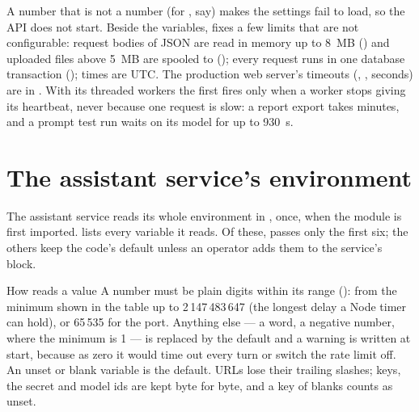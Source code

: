 A number that is not a number (for , say) makes the settings fail to
load, so the API does not start. Beside the variables,  fixes a few limits
that are not configurable: request bodies of JSON are read in memory up to 8~MB
() and uploaded files above 5~MB are spooled to
 (); every request runs in one database
transaction (); times are UTC. The production web server's timeouts
(, ,  seconds) are in
. With its threaded workers the first fires only when a worker
stops giving its heartbeat, never because one request is slow: a report export takes minutes,
and a prompt test run waits on its model for up to 930~s.


\section{The assistant service's environment}\label{sec:config:assistant}

The assistant service reads its whole environment in , once, when the module
is first imported.  lists every variable it reads. Of these,
 passes only the first six; the others keep the code's default
unless an operator adds them to the service's  block.

\begin{codebox}{How  reads a value}
A number must be plain digits within its range (): from the minimum shown
in the table up to 2\,147\,483\,647 (the longest delay a Node timer can hold), or 65\,535 for
the port. Anything else --- a word, a negative number,  where the minimum is 1 --- is
replaced by the default and a warning is written at start, because as zero it would time out
every turn or switch the rate limit off. An unset or blank variable is the default. URLs lose
their trailing slashes; keys, the secret and model ids are kept byte for byte, and a key of
blanks counts as unset.
\end{codebox}

